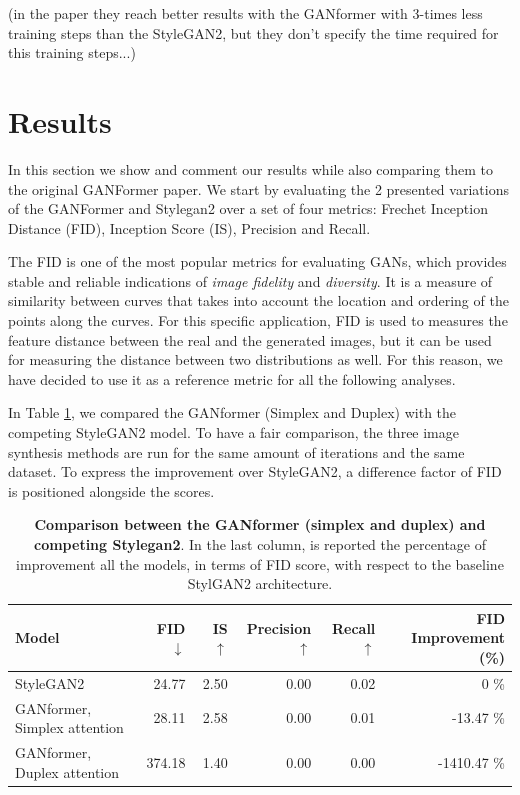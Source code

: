 \documentclass{article}
\begin{document}
	(in the paper they reach better results with the GANformer with 3-times less training steps than the 
	StyleGAN2, but they don't specify the time required for this training steps...)

	\section{Results}%
	In this section we show and comment our results while also comparing them to the original GANFormer paper.
	We start by evaluating the 2 presented variations of the GANFormer and Stylegan2 over a set of 
	four metrics: Frechet Inception Distance (FID), Inception Score (IS), Precision and Recall.
	
	The FID is one of the most popular metrics for evaluating GANs, which provides stable and reliable 
	indications of \textit{image fidelity} and \textit{diversity}. 
	It is a measure of similarity between curves that takes into account the location and ordering of the 
	points along the curves. 
	For this specific application, FID is used to measures the feature distance between the real and the 
	generated images, but it can be used for measuring the distance between two distributions as well.
	For this reason, we have decided to use it as a reference metric for all the following analyses.
	
	In Table \ref{tab:our-results}, we compared the GANformer (Simplex and Duplex) with the competing 
	StyleGAN2 model. To have a fair comparison, the three image synthesis methods are run for the 
	same amount of iterations and the same dataset.
	To express the improvement over StyleGAN2, a difference factor of FID is positioned alongside the 
	scores.
	\begin{table}[htb]
    	\centering
		\caption{\textbf{Comparison between the GANformer (simplex and duplex) and competing 
		Stylegan2}.  In the last column, is reported the percentage of improvement all the models, in terms 
			of FID score, with respect to the baseline StylGAN2 architecture.}
		\label{tab:our-results}
		\vspace{3mm}
		\small
		\begin{tabular}{l|rrrrr}
			\toprule
			Model                        & FID $\downarrow$  & IS $\uparrow$& Precision$\uparrow$  & Recall 
			$\uparrow$& FID Improvement (\%)\\ 
			\midrule
			StyleGAN2                    &  24.77 & 2.50 & 0.00 & 0.02 & 0 \%\\ 
			GANformer, Simplex attention & 28.11 & 2.58 & 0.00 & 0.01 & -13.47 \%\\ 
			GANformer, Duplex attention  & 374.18 & 1.40 & 0.00 & 0.00 & -1410.47 \% \\ 
			\bottomrule
		\end{tabular}
	\end{table}
	
\end{document}
